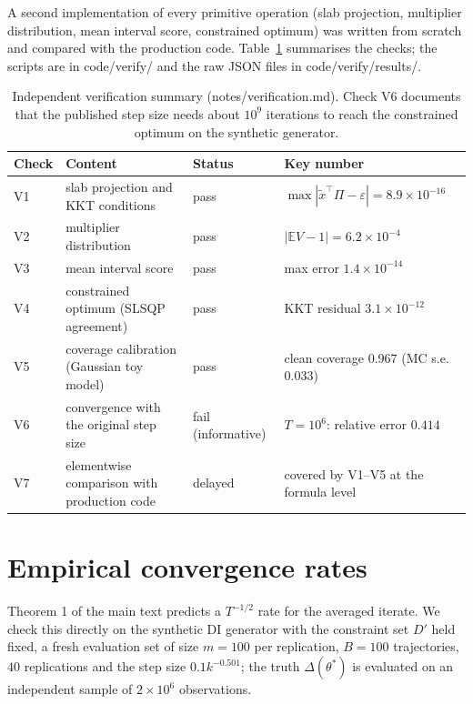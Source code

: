 \documentclass[11pt]{article}
\begin{document}
A second implementation of every primitive operation (slab projection, multiplier
distribution, mean interval score, constrained optimum) was written from scratch and compared
with the production code.  Table~\ref{tab:verify} summarises the checks; the scripts are in
code/verify/ and the raw JSON files in code/verify/results/.

\begin{table}[h]
\centering
\small
\caption{Independent verification summary (notes/verification.md).  Check V6 documents that the published step size needs about $10^9$ iterations to reach the constrained optimum on the synthetic generator.}
\label{tab:verify}
\begin{tabular}{p{}p{}p{}p{}}
\toprule
Check & Content & Status & Key number \\
\midrule
V1 & slab projection and KKT conditions & pass & $\max|\tilde x^\top\Pi-\varepsilon|=8.9\times10^{-16}$ \\
V2 & multiplier distribution & pass & $|\mathbb E V-1|=6.2\times10^{-4}$ \\
V3 & mean interval score & pass & max error $1.4\times10^{-14}$ \\
V4 & constrained optimum (SLSQP agreement) & pass & KKT residual $3.1\times10^{-12}$ \\
V5 & coverage calibration (Gaussian toy model) & pass & clean coverage $0.967$ (MC s.e. 0.033) \\
V6 & convergence with the original step size & fail (informative) & $T=10^6$: relative error $0.414$ \\
V7 & elementwise comparison with production code & delayed & covered by V1--V5 at the formula level \\
\bottomrule
\end{tabular}
\end{table}

\section{Empirical convergence rates}

Theorem 1 of the main text predicts a $T^{-1/2}$ rate for the averaged iterate.  We check
this directly on the synthetic DI generator with the constraint set $D'$ held fixed, a fresh
evaluation set of size $m=100$ per replication, $B=100$ trajectories, $40$ replications and the
step size $0.1k^{-0.501}$; the truth $\Delta(\theta^*)$ is evaluated on an independent sample of
$2\times 10^6$ observations.
\end{document}
